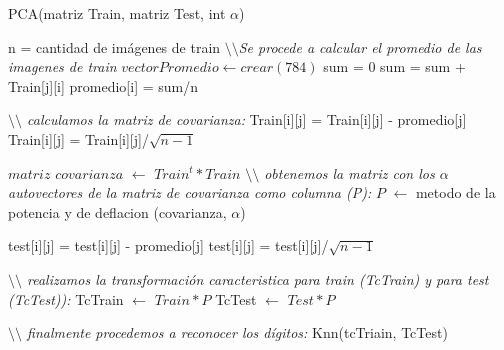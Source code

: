 \begin{algorithm}[H]
\caption{PCA(matriz Train, matriz Test, int $\alpha$)}
\begin{algorithmic}[1]
\State n = cantidad de imágenes de train
\State \textit{$\setminus\setminus$Se procede a calcular el promedio de las imagenes de train}
\State $ vector Promedio \gets crear(784)$
	\State sum = 0	
		\State sum = sum + Train[j][i]
	\EndFor
	\State promedio[i] = sum/n
\EndFor

\State \textit{$\setminus\setminus$ calculamos la matriz de covarianza:}
		\State Train[i][j] = Train[i][j] - promedio[j]
	\EndFor
	\State Train[i][j] = Train[i][j]/$\sqrt{n-1}$
\EndFor	

\State $matriz$ $covarianza$ $\gets$ $Train^{t}*Train$	
\State \textit{$\setminus\setminus$ obtenemos la matriz con los $\alpha$ autovectores de la matriz de covarianza como columna (P):}
\State $P$ $\gets$ metodo de la potencia y de deflacion (covarianza, $\alpha$)

		\State test[i][j] = test[i][j] - promedio[j]
	\EndFor
	\State test[i][j] = test[i][j]/$\sqrt{n-1}$
\EndFor	

\State \textit{$\setminus\setminus$ realizamos la transformaci\'on caracteristica para train (TcTrain) y para test (TcTest)):}
\State  TcTrain $\gets$ $Train*P$
\State  TcTest $\gets$ $Test*P$


\State \textit{$\setminus\setminus$ finalmente procedemos a reconocer los d\'igitos:}
\State Knn(tcTriain, TcTest)
\end{algorithmic}
\end{algorithm}


